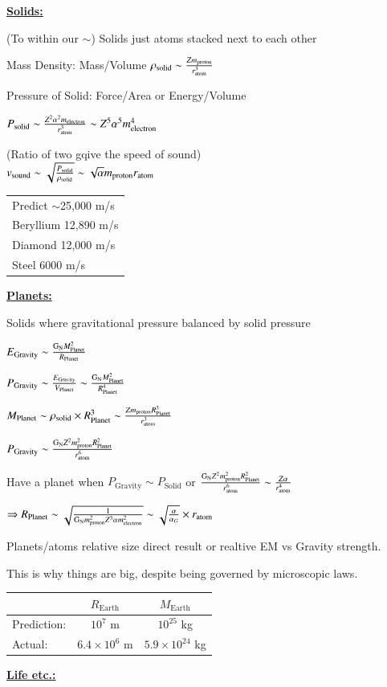 {\underline{\textbf{Solids:}}

(To within our $\sim$) Solids just atoms stacked next to each other

Mass Density: Mass/Volume
$\rho_{\textrm{solid}} \sim \frac{Zm_{\textrm{proton}}}{r_{\textrm{atom}}^3}$

Pressure of Solid: Force/Area or Energy/Volume

$P_{\textrm{solid}} \sim \frac{Z^2\alpha^2m_{\textrm{electron}}}{r_{\textrm{atom}}^3} \sim Z^5\alpha^5m_{\textrm{electron}}^4$


(Ratio of two gqive the speed of sound)\\
$v_{\textrm{sound}}\sim \sqrt{\frac{P_{\textrm{solid}}} {\rho_{\textrm{solid}}}} \sim \sqrt{\alpha} {m_{\textrm{proton}} r_{\textrm{atom}}}$
\begin{tabular}{l}
Predict $\sim$25,000 m/s \\
Beryllium 12,890 m/s     \\
Diamond 12,000 m/s       \\
Steel 6000 m/s           \\
\end{tabular}


\underline{\textbf{Planets:}}

Solids where gravitational pressure balanced by solid pressure

$E_{\textrm{Gravity}} \sim \frac{\textrm{G}_\textrm{N} M_{\textrm{Planet}}^2}{R_{\textrm{Planet}}}$

$P_{\textrm{Gravity}} \sim \frac{E_{\textrm{Gravity}}}{V_{\textrm{Planet}}} \sim \frac{\textrm{G}_\textrm{N} M_{\textrm{Planet}}^2}{R_{\textrm{Planet}}^4}$

$M_{\textrm{Planet}} \sim \rho_{\textrm{solid}} \times R_{\textrm{Planet}}^3 \sim \frac{Zm_{\textrm{proton}} R_{\textrm{Planet}}^3}{r_{\textrm{atom}}^3}$

$P_{\textrm{Gravity}} \sim \frac{\textrm{G}_\textrm{N} Z^2 m_{\textrm{proton}}^2 R_{\textrm{Planet}}^2}{r_{\textrm{atom}}^6} $

Have a planet when $P_{\textrm{Gravity}} \sim P_{\textrm{Solid}}$  or $\frac{\textrm{G}_\textrm{N} Z^2 m_{\textrm{proton}}^2 R_{\textrm{Planet}}^2}{r_{\textrm{atom}}^6} \sim \frac{Z\alpha}{r_{\textrm{atom}}^4}$

$\Rightarrow R_{\textrm{Planet}} \sim \sqrt{\frac{1}{\textrm{G}_\textrm{N} m_{\textrm{proton}}^2 Z^3 \alpha m_{\textrm{electron}}^2}}  \sim \sqrt{\frac{\alpha}{\alpha_G}} \times r_{\textrm{atom}} $

Planets/atoms relative size direct result or realtive EM vs Gravity strength.

This is why things are big, despite being governed by microscopic laws.

\begin{tabular}{lcc}
  & $R_{\textrm{Earth}}$ & $M_{\textrm{Earth}}$  \\
\hline
Prediction:  & $10^7$ m & $10^{25}$ kg\\
Actual:      & $6.4 \times 10^6$ m & $5.9 \times 10^{24}$ kg\\
\end{tabular}

\underline{\textbf{Life etc.:}}

 
}




